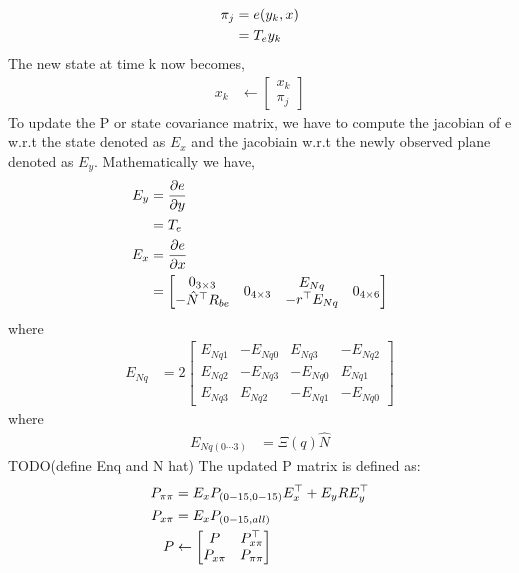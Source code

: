 \documentclass[]{article}
\begin{document}
{\begin{align}
	\pi_j	&= e(y_k,x) \notag \\
			&= T_e y_k
\end{align}
The new state at time k now becomes, 
\begin{align}
	x_{k} &\leftarrow
	\left[
	\begin{matrix}
		x_{k} \\
		\pi_j
	\end{matrix}
	\right]
\end{align}
To update the P or state covariance matrix, we have to compute the jacobian of e w.r.t the state denoted as $E_x$ and the jacobiain w.r.t the newly observed plane denoted as $E_y$. Mathematically we have, 
\begin{align}
	E_y &= \frac{\partial e}{\partial y} \notag \\
		&= T_e \\
	E_x &= \frac{\partial e}{\partial x} \notag \\
		&=
	\left[
	\begin{matrix}
		\begin{matrix}
			0_{3 \times 3} \\
			-\hat{N}^\top R_{be}
		\end{matrix}
		&
		0_{4 \times 3}
		&
		\begin{matrix}
			E_{Nq} \\
			-r^\top E_{Nq}
		\end{matrix}
		&
		0_{4 \times 6}
	\end{matrix}
	\right]
\end{align}
where
\begin{align}
	E_{Nq} 	&= 2
	\left[
	\begin{matrix}
		E_{Nq1} 	& -E_{Nq0} 	& E_{Nq3} 	& -E_{Nq2} \\
		E_{Nq2} 	& -E_{Nq3} 	& -E_{Nq0} 	& E_{Nq1} \\
		E_{Nq3} 	& E_{Nq2} 	& -E_{Nq1} 	& -E_{Nq0}
	\end{matrix}
	\right]
\end{align}
where
\begin{align}
	E_{Nq(0\cdots3)} &= \Xi(q) \hat{N}
\end{align}
TODO(define Enq and N hat)
The updated P matrix is defined as: 
\begin{align}
	P_{\pi \pi} &= E_x P_{(0-15,0-15)} E_x^\top + E_y R E_y^\top \notag \\
	P_{x \pi} 	&= E_x P_{(0-15,all)} \notag \\
	P &\leftarrow
	\left[
	\begin{matrix}
		P 			& P_{x \pi}^\top \\
		P_{x \pi}	& P_{\pi \pi}
	\end{matrix}
	\right]
\end{align}

}
\end{document}
